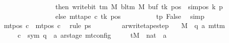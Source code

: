 \begin{isabellebody}
\ \ \ \ \ \ \ \ \ \ \ \ \ \ \ \ then\ write{\isacharunderscore}{\kern0pt}bit\ {\isacharparenleft}{\kern0pt}{\isasymGamma}{\isacharunderscore}{\kern0pt}tm\ M{\isacharparenright}{\kern0pt}\ {\isacharparenleft}{\kern0pt}bl{\isacharunderscore}{\kern0pt}tm\ M{\isacharparenright}{\kern0pt}\ {\isacharparenleft}{\kern0pt}buf\ tk{\isacharparenright}{\kern0pt}\ {\isacharparenleft}{\kern0pt}pos\ {\isacharminus}{\kern0pt}\ sim{\isacharunderscore}{\kern0pt}pos\ {\isacharquery}{\kern0pt}k\ p{\isacharparenright}{\kern0pt}\isanewline
\ \ \ \ \ \ \ \ \ \ \ \ \ \ \ \ else\ mt{\isacharunderscore}{\kern0pt}tape\ c{\isacharprime}{\kern0pt}\ tk\ pos{\isacharparenright}{\kern0pt}{\isacharparenright}{\kern0pt}{\isacharparenright}{\kern0pt}{\isachardoublequoteclose}\isanewline
\ \ \ \ \ \ \ \ \isamarkupfalse%
\ tp\ False\ \isamarkupfalse%
\ simp\isanewline
\ \ \ \ \ \ \isamarkupfalse%
\ {\isachardoublequoteopen}mt{\isacharunderscore}{\kern0pt}pos\ c{\isacharprime}{\kern0pt}{\isacharprime}{\kern0pt}\ {\isacharequal}{\kern0pt}\ mt{\isacharunderscore}{\kern0pt}pos\ c{\isacharprime}{\kern0pt}{\isachardoublequoteclose}\ \isamarkupfalse%
\ {\isacharparenleft}{\kern0pt}rule\ ps{\isacharprime}{\kern0pt}{\isacharparenright}{\kern0pt}\isanewline
\ \ \ \ \isamarkupfalse%
\isanewline
\ \ \isamarkupfalse%
\isanewline
{}\isamarkupfalse%
%
\endisatagproof
{\isafoldproof}%
%
\isadelimproof
\isanewline
%
\endisadelimproof
\isanewline
{}\isamarkupfalse%
\ ar{\isacharunderscore}{\kern0pt}write{\isacharunderscore}{\kern0pt}tape{\isacharunderscore}{\kern0pt}step{\isacharcolon}{\kern0pt}\isanewline
\ \ \ M\ {\isacharcolon}{\kern0pt}{\isacharcolon}{\kern0pt}\ {\isachardoublequoteopen}{\isacharparenleft}{\kern0pt}{\isacharprime}{\kern0pt}q{\isacharcomma}{\kern0pt}\ {\isacharprime}{\kern0pt}a{\isacharparenright}{\kern0pt}\ mttm{\isachardoublequoteclose}\isanewline
\ \ \ \ \ c{\isacharprime}{\kern0pt}\ {\isacharcolon}{\kern0pt}{\isacharcolon}{\kern0pt}\ {\isachardoublequoteopen}{\isacharparenleft}{\kern0pt}sym{}{\isacharcomma}{\kern0pt}\ {\isacharprime}{\kern0pt}q\ {\isasymtimes}\ {\isacharprime}{\kern0pt}a\ ar{\isacharunderscore}{\kern0pt}stage{\isacharparenright}{\kern0pt}\ mt{\isacharunderscore}{\kern0pt}config{\isachardoublequoteclose}\isanewline
\ \ \ \ \ tM\ {\isacharcolon}{\kern0pt}{\isacharcolon}{\kern0pt}\ {\isachardoublequoteopen}nat\ {\isasymRightarrow}\ {\isacharprime}{\kern0pt}a{\isachardoublequoteclose}\isanewline

\end{isabellebody}
